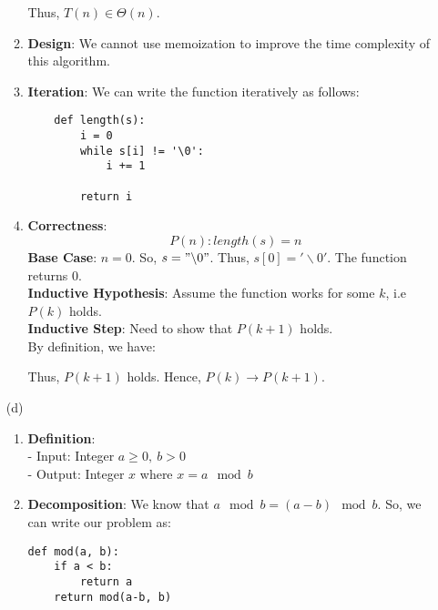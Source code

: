 \documentclass[a4paper]{article}
\begin{document}
\begin{enumerate}
\begin{enumerate}[label=\roman*]
Thus, $T(n) \in \Theta(n)$.\\

\item \textbf{Design}: We cannot use memoization to improve the time complexity of this algorithm.

\item \textbf{Iteration}: We can write the function iteratively as follows:
\begin{verbatim}
    def length(s):
        i = 0
        while s[i] != '\0':
            i += 1

        return i
\end{verbatim}

\item \textbf{Correctness}:
$$P(n): length(s) = n$$
\textbf{Base Case}: $n = 0$. So, $s = "\backslash 0"$. Thus, $s[0] = '\backslash 0'$. The function returns 0. \\
\textbf{Inductive Hypothesis}: Assume the function works for some $k$, i.e $P(k)$ holds.\\
\textbf{Inductive Step}: Need to show that $P(k+1)$ holds.\\
By definition, we have:

Thus, $P(k+1)$ holds. Hence, $P(k) \rightarrow P(k+1)$.\\

\end{enumerate}

(d)
\begin{enumerate}[label=\roman*]
    \item \textbf{Definition}:\\
    - Input: Integer $a \geq 0,\ b > 0$\\
    - Output: Integer $x$ where $x = a \mod b$

    \item \textbf{Decomposition}: We know that $a \mod b = (a-b) \mod b$. So, we can write our problem as:
\begin{verbatim}
def mod(a, b):
    if a < b:
        return a
    return mod(a-b, b)
\end{verbatim}


\end{enumerate}
\end{enumerate}
\end{document}
